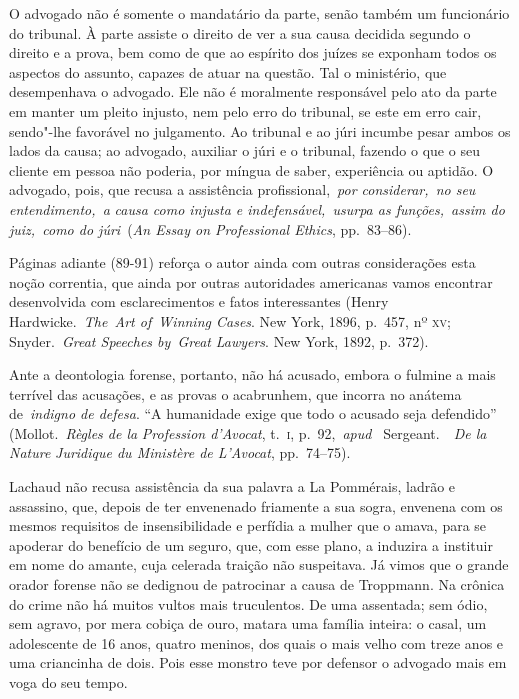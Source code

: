 \begin{hedraquote}
O advogado não é somente o mandatário da parte, senão também um 
funcionário do tribunal. À parte
assiste o direito de ver a sua causa decidida segundo o direito e a
prova, bem como de que ao espírito dos juízes se exponham todos os
aspectos do assunto, capazes de atuar na questão. Tal o ministério, que
desempenhava o advogado. Ele não é moralmente responsável pelo ato da
parte em manter um pleito injusto, nem pelo erro do tribunal, se este
em erro cair, sendo"-lhe favorável no julgamento. Ao tribunal e ao júri
incumbe pesar ambos os lados da causa; ao advogado, auxiliar o júri e o
tribunal, fazendo o que o seu cliente em pessoa não poderia, por míngua
de saber, experiência ou aptidão. O advogado, pois, que recusa a
assistência profissional, \textit{por considerar, no seu
entendimento, a} \textit{causa como injusta e indefensável, usurpa as
funções, assim do} \textit{juiz, como do júri} (\textit{An Essay on
Professional Ethics}, pp.~83--86). 
\end{hedraquote}

Páginas adiante (89-91) reforça o
autor ainda com outras considerações esta noção correntia, que ainda
por outras autoridades americanas vamos encontrar desenvolvida com
esclarecimentos e fatos interessantes (Henry Hardwicke. \textit{The Art
of Winning Cases}. New York, 1896, p.~457, nº \textsc{xv};
Snyder. \textit{Great Speeches by Great} \textit{Lawyers}. New York,
1892, p.~372). 

Ante a deontologia forense, portanto, não há acusado,
embora o fulmine a mais terrível das acusações, e as provas o
acabrunhem, que incorra no anátema de \textit{indigno de defesa}. “A
humanidade exige que todo o acusado seja defendido”
(Mollot. \textit{Règles de la} \textit{Profession d'Avocat}, t.~\textsc{i}, 
p.~92, \textit{apud } Sergeant.  \textit{De la Nature} \textit{Juridique
du Ministère de L'Avocat}, pp.~74--75). 

Lachaud não recusa assistência da
sua palavra a La Pommérais, ladrão e assassino, que, depois de ter
envenenado friamente a sua sogra, envenena com os mesmos requisitos de
insensibilidade e perfídia a mulher que o amava, para se apoderar do
benefício de um seguro, que, com esse plano, a induzira a instituir em
nome do amante, cuja celerada traição não suspeitava. Já vimos que o
grande orador forense não se dedignou de patrocinar a causa de
Troppmann. Na crônica do crime não há muitos vultos mais truculentos.
De uma assentada; sem ódio, sem agravo, por mera cobiça de ouro, matara
uma família inteira: o casal, um adolescente de 16 anos, quatro
meninos, dos quais o mais velho com treze anos e uma criancinha de
dois. Pois esse monstro teve por defensor o advogado mais em voga do
seu tempo. 

